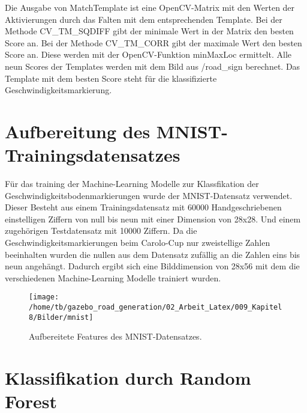 Die Ausgabe von MatchTemplate ist eine OpenCV-Matrix mit den Werten der Aktivierungen durch das Falten mit dem entsprechenden Template.
Bei der Methode CV\_TM\_SQDIFF gibt der minimale Wert in der Matrix den besten Score an. Bei der Methode CV\_TM\_CORR gibt der maximale Wert den besten Score an. Diese werden mit der OpenCV-Funktion minMaxLoc ermittelt.
Alle neun Scores der Templates werden mit dem Bild aus /road\_sign berechnet.
Das Template mit dem besten Score steht f{\"u}r die klassifizierte Geschwindigkeitsmarkierung. 



\section{Aufbereitung des MNIST-Trainingsdatensatzes}
\label{sec:Aufbereitung des MNIST-Trainingsdatensatzes}

F{\"u}r das training der Machine-Learning Modelle zur Klassfikation der Geschwindigkeitsbodenmarkierungen wurde der MNIST-Datensatz verwendet.
Dieser Besteht aus einem Trainingsdatensatz mit 60000 Handgeschriebenen einstelligen Ziffern von null bis neun mit einer Dimension von 28x28. Und einem zugeh{\"o}rigen Testdatensatz mit 10000 Ziffern.
Da die Geschwindigkeitsmarkierungen beim Carolo-Cup nur zweistellige Zahlen beeinhalten wurden die nullen aus dem Datensatz zuf{\"a}llig an die Zahlen eins bis neun angeh{\"a}ngt. Dadurch ergibt sich eine Bilddimension von 28x56 mit dem die verschiedenen Machine-Learning Modelle trainiert wurden.

\begin{figure}[H]
\begin{center}
  \texttt{[image: /home/tb/gazebo\_road\_generation/02\_Arbeit\_Latex/009\_Kapitel8/Bilder/mnist]}%
  \caption[Aufbereitete Features des MNIST-Datensatzes]%
           {\label{fig:Aufbereitete Features des MNIST-Datensatzes}%
           Aufbereitete Features des MNIST-Datensatzes.
           }
\end{center}
\end{figure}

\section{Klassifikation durch Random Forest}
\label{sec:Klassifikation durch Random Forest}

